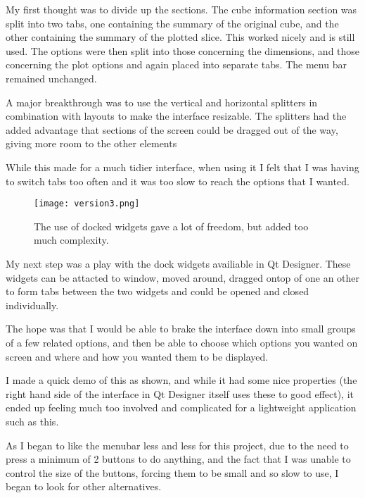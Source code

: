 \documentclass[whitecover]{MO_report}
\begin{document}
\vspace{4mm}

My first thought was to divide up the sections. The cube information section
was split into two tabs, one containing the summary of the original cube,
and the other containing the summary of the plotted slice. This worked nicely
and is still used. The options were then split into those concerning the
dimensions, and those concerning the plot options and again placed into
separate tabs. The menu bar remained unchanged.

A major breakthrough was to use the vertical and horizontal splitters in
combination with layouts to make the interface resizable. The splitters
had the added advantage that sections of the screen could be dragged out of
the way, giving more room to the other elements

While this made for a much tidier interface, when using it I felt that I was
having to switch tabs too often and it was too slow to reach the options that
I wanted.

\vspace{4mm}

\begin{figure}[ht!]
\centering
\texttt{[image: version3.png]}
\caption{The use of docked widgets gave a lot of freedom, but added too much
complexity.}
\label{overflow}
\end{figure}

My next step was a play with the dock widgets availiable in Qt Designer.
These widgets can be attacted to window, moved around, dragged ontop of one an
other to form tabs between the two widgets and could be opened and closed
individually.

The hope was that I would be able to brake the interface down into
small groups of a few related options, and then be able to choose which options
you wanted on screen and where and how you wanted them to be displayed.

I made a quick demo of this as shown, and while it had some nice properties
(the right hand side of the interface in Qt Designer itself uses these to good
effect), it ended up feeling much too involved and complicated for a lightweight
application such as this.

\vspace{4mm}

As I began to like the menubar less and less for this project, due to the need
to press a minimum of 2 buttons to do anything, and the fact that I was unable to
control the size of the buttons, forcing them to be small and so slow to use, I
began to look for other alternatives.
\end{document}
